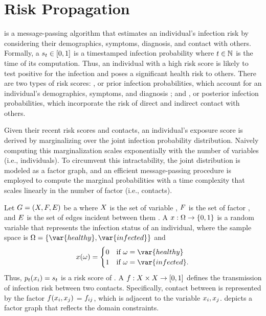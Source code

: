 \chapter{Risk Propagation}\label{ch:risk-propagation}

 is a message-passing algorithm that estimates an individual's infection risk by considering their demographics, symptoms, diagnosis, and contact with others. Formally, a  $s_t \in [0, 1]$ is a timestamped infection probability where $t \in \mathbb{N}$ is the time of its computation. Thus, an individual with a high risk score is likely to test positive for the infection and poses a significant health risk to others. There are two types of risk scores: , or prior infection probabilities, which account for an individual's demographics, symptoms, and diagnosis \citep{Briers2020, Menni2020}; and , or posterior infection probabilities, which incorporate the risk of direct and indirect contact with others.

Given their recent risk scores and contacts, an individual's exposure score is derived by marginalizing over the joint infection probability distribution. Naively computing this marginalization scales exponentially with the number of variables (i.e., individuals). To circumvent this intractability, the joint distribution is modeled as a factor graph, and an efficient message-passing procedure is employed to compute the marginal probabilities with a time complexity that scales linearly in the number of factor \verticesName (i.e., contacts).

Let $G = (X, F, E)$ be a  where $X$ is the set of variable \verticesName, $F$ is the set of factor \verticesName, and $E$ is the set of edges incident between them \citep{Kschischang2001}. A  $\vVariable: \eventSpace \rightarrow \{0, 1\} $ is a random variable that represents the infection status of an individual, where the sample space is $\eventSpace = \{\var{healthy}, \var{infected}\}$ and
\begin{equation*}
  \vVariable(\event) =
    \begin{cases}
      0 & \text{if } \event = \var{healthy} \\
      1 & \text{if } \event = \var{infected}.
    \end{cases}
\end{equation*}
Thus, $\pr{\vVariable[i]}[\vTime] = \vScore_\vTime$ is a risk score of . A  $\vFactor: \vVariables \times \vVariables \rightarrow [0, 1]$ defines the transmission of infection risk between two contacts. Specifically, contact between  is represented by the factor \vertexName $\vFactor(\vVariable[i], \vVariable[j])$ = $\vFactor[ij]$, which is adjacent to the variable \verticesName $\vVariable[i], \vVariable[j]$.  depicts a factor graph that reflects the domain constraints.

